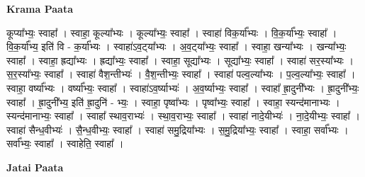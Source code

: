 \documentclass[17pt]{extarticle}
\begin{document}
\textbf{Krama Paata} \newline

कूप्या᳚भ्यः॒ स्वाहा᳚ । स्वाहा॒ कूल्या᳚भ्यः । कूल्या᳚भ्यः॒ स्वाहा᳚ । स्वाहा॑ विक॒र्या᳚भ्यः । वि॒क॒र्या᳚भ्यः॒ स्वाहा᳚ । वि॒क॒र्या᳚भ्य॒ इति॑ वि - क॒र्या᳚भ्यः । स्वाहा॑ऽव॒ट्‍या᳚भ्यः । अ॒व॒ट्‍या᳚भ्यः॒ स्वाहा᳚ । स्वाहा॒ खन्या᳚भ्यः । खन्या᳚भ्यः॒ स्वाहा᳚ । स्वाहा॒ ह्रद्या᳚भ्यः । ह्रद्या᳚भ्यः॒ स्वाहा᳚ । स्वाहा॒ सूद्या᳚भ्यः । सूद्या᳚भ्यः॒ स्वाहा᳚ । स्वाहा॑ सर॒स्या᳚भ्यः । स॒र॒स्या᳚भ्यः॒ स्वाहा᳚ । स्वाहा॑ वैश॒न्तीभ्यः॑ । वै॒श॒न्तीभ्यः॒ स्वाहा᳚ । स्वाहा॑ पल्व॒ल्या᳚भ्यः । प॒ल्व॒ल्या᳚भ्यः॒ स्वाहा᳚ । स्वाहा॒ वर्ष्या᳚भ्यः । वर्ष्या᳚भ्यः॒ स्वाहा᳚ । स्वाहा॑ऽव॒र्ष्याभ्यः॑ । अ॒व॒र्ष्याभ्यः॒ स्वाहा᳚ । स्वाहा᳚ ह्रा॒दुनी᳚भ्यः । ह्रा॒दुनी᳚भ्यः॒ स्वाहा᳚ । ह्रा॒दुनी᳚भ्य॒ इति॑ ह्रा॒दुनि॑ - भ्यः॒ । स्वाहा॒ पृष्वा᳚भ्यः । पृष्वा᳚भ्यः॒ स्वाहा᳚ । स्वाहा॒ स्यन्द॑मानाभ्यः । स्यन्द॑मानाभ्यः॒ स्वाहा᳚ । स्वाहा᳚ स्थाव॒राभ्यः॑ । स्था॒व॒राभ्यः॒ स्वाहा᳚ । स्वाहा॑ नादे॒यीभ्यः॑ । ना॒दे॒यीभ्यः॒ स्वाहा᳚ । स्वाहा॑ सैन्ध॒वीभ्यः॑ । सै॒न्ध॒वीभ्यः॒ स्वाहा᳚ । स्वाहा॑ समु॒द्रिया᳚भ्यः । स॒मु॒द्रिया᳚भ्यः॒ स्वाहा᳚ । स्वाहा॒ सर्वा᳚भ्यः । सर्वा᳚भ्यः॒ स्वाहा᳚ । स्वाहेति॒ स्वाहा᳚ । \newline

\textbf{Jatai Paata} \newline
\end{document}
